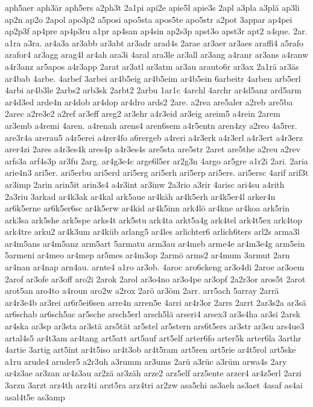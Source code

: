 {aph5aer
aph3är
aph5ers
a2ph3t
2a1pi
api2e
apie5l
apie3s
2apl
a3pla
a3plä
ap3li
ap2n
ap2o
2apol
apo3p2
a5posi
apo5sta
apos5te
apo5str
a2pot
3appar
ap4pei
ap2p3f
ap4pre
ap4p3ru
a1pr
ap4san
ap4sin
ap2s3p
apst3o
apst3r
apt2
a4que.
2ar.
a1ra
a3ra.
ar4a3a
ar3abb
ar3abt
ar3adr
arad4s
2arae
ar3aer
ar3aes
araffi4
a5rafo
arafor4
ar3agg
arag4l
ar4ah
ara3i
4aral
ara3le
ar3all
ar3ang
a4ranr
ar3ans
a4ranw
a4r3anz
ar5apos
a4r3app
2arat
ar3atl
ar3atm
ar3au
arauto6r
ar3ax
2a1rä
ar3äs
ar4bab
4arbe.
4arbef
3arbei
ar4b5eig
ar4b5eim
ar4b5ein
6arbeitr
4arben
arb5erl
4arbi
ar4b3le
2arbs2
arb3sk
2arbt2
2arbu
1ar1c
4archl
4archr
ar4d5anz
ard5arm
ar4d3ed
arde4n
ar4dob
ar4dop
ar4dro
ards2
2are.
a2rea
are5aler
a2reb
are5ba
2arec
a2re3e2
a2ref
ar3eff
areg2
ar3ehr
a4r3eid
ar3eig
areim5
a4rein
2arem
ar3emb
a4remi
4aren.
a4renah
arens4
aren6sem
a4r5entn
aren4zy
a2reo
4a5rer.
are3r4a
arerau5
a4r5erei
a4rer4fo
a6rergeb
a4reri
a4r3erk
a4r3erl
a4r3ert
a4r3erz
arer4zi
2ares
a4r3es4k
ares4p
a4r3es4s
are5sta
are5str
2aret
are5the
a2reu
a2rev
arfs3a
arf4s3p
ar3fu
2arg.
ar4g3e4c
arge6l5er
ar2g3n
4argo
ar5gre
a1r2i
2ari.
2aria
arie4n3
ari5er.
ari5erbu
ari5erd
ari5erg
ari5erh
ari5erp
ari5ers.
ari5ersc
4arif
arif3t
ar3imp
2arin
arin5it
arin3s4
a4r3int
ar3inw
2a3rio
a3rir
4arisc
ari4su
a4rith
2a3riu
3arkad
ar4k3ak
ar4kal
ark5aue
ar4käh
ar4k5erh
ar4k5er4l
arker4n
ar6k5erne
ar6k5er6sc
ar4k5erw
ar4kid
ar4k5inn
ark4lö
ar4kne
ar4koa
ark5rin
ark3sa
ark5she
ark5spe
arks4t
ark5stu
ark4ta
arkt5a4g
ark4tel
ark4t5ex
ark4top
ark4tre
arku2
ar4k3um
ar4küb
arlang5
ar4les
arlichter6
arlich6ters
arl2s
arma3l
ar4m5ans
ar4m5anz
arm5art
5armatu
arm3au
ar4meb
arme4e
ar4m3e4g
arm5ein
5armeni
ar4meo
ar4mep
ar5mes
ar4m3op
2armö
arms2
ar4mum
3armut
2arn
ar4nan
ar4nap
arn4au.
arnte4
a1ro
ar3ob.
4aroc
aro6ckeng
ar3o4di
2aroe
ar3oem
2arof
ar3ofe
ar3off
aro2i
2arok
2arol
ar3o4no
ar3o4pe
ar3opf
2a2r3or
aros5t
2arot
arot5an
aro4to
a4roun
aro2w
a2rox
2arö
ar3öm
2arr.
arr5ach
5array
2arrä
ar4r3e4b
ar3rei
ar6r5ei6sen
arre4n
arren5e
4arri
ar4r3or
2arrs
2arrt
2ar3s2a
ar3sä
ar6schab
ar6sch5ac
ar5sche
arsch5erl
arsch5lä
arseri4
arsex3
ar3s4ha
ar3si
2arsk
ar4ska
ar3sp
ar3sta
ar3stä
ars5tät
ar5stel
ar5stern
ars6t5ers
ar3str
ar3su
ars4ue3
artal4s5
ar4t3am
ar4tang
art5att
art5auf
art5elf
arter6fo
arter5k
arter6la
3arthr
4artie
3artig
art5int
ar4t5iso
ar4t3ob
ar4t5ram
art5ren
art5rie
ar4t5rol
art5ske
a1ru
arude4
aruder5
a2r3uh
a3rumm
ar3ums
2arü
a3rüc
a3rüm
arwa4s
2ary
ar4z3ae
ar3zan
ar4z3au
ar2zä
ar3zäh
arze2
arz5elf
arz5ente
arzer4
ar4z5erl
2arzi
3arzn
3arzt
arz4th
arz4ti
arzt5ra
arz4tri
ar2zw
asa5chi
as3aeh
as3aet
4asaf
as4ai
asal4t5e
as3amp
}
